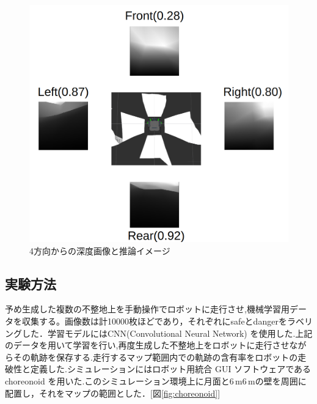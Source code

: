 \documentclass[uplatex,twocolumn, dvipdfmx]{jsarticle}  %
\begin{document}
\begin{figure}[t]
  \begin{center}
    \includegraphics[width=1.0\linewidth]{images/planning.png}
    \caption{4方向からの深度画像と推論イメージ}
    \label{fig:planning}
  \end{center}
\end{figure}

\subsection{実験方法}
予め生成した複数の不整地上を手動操作でロボットに走行させ,機械学習用データを収集する。画像数は計10000枚ほどであり，それぞれにsafeとdangerをラベリングした．学習モデルにはCNN(Convolutional Neural Network) を使用した.上記のデータを用いて学習を行い,再度生成した不整地上をロボットに走行させながらその軌跡を保存する.走行するマップ範囲内での軌跡の含有率をロボットの走破性と定義した.\cite{bunken2}シミュレーションにはロボット用統合 GUI ソフトウェアであるchoreonoid を用いた.このシミュレーション環境上に月面と$6 \mathrm{\,m}$\times$6\mathrm{\,m}$の壁を周囲に配置し，それをマップの範囲とした．[図\ref{fig:choreonoid}]

\end{document}
